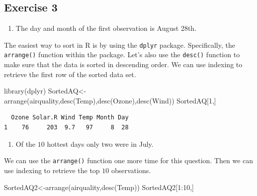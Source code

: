 \documentclass[
  letterpaper,
  DIV=11,
  numbers=noendperiod]{scrreprt}
\newenvironment{Shaded}{\begin{snugshade}}{\end{snugshade}}
\newcommand{\DecValTok}[1]{\textcolor[rgb]{0.68,0.00,0.00}{#1}}
\newcommand{\FunctionTok}[1]{\textcolor[rgb]{0.28,0.35,0.67}{#1}}
\newcommand{\NormalTok}[1]{\textcolor[rgb]{0.00,0.23,0.31}{#1}}
\newcommand{\OtherTok}[1]{\textcolor[rgb]{0.00,0.23,0.31}{#1}}
\newcommand{\SpecialCharTok}[1]{\textcolor[rgb]{0.37,0.37,0.37}{#1}}
\providecommand{\tightlist}{%
  \setlength{\itemsep}{0pt}\setlength{\parskip}{0pt}}\usepackage{longtable,booktabs,array}
\begin{document}
\hypertarget{exercise-3-1}{%
\subsection*{Exercise 3}\label{exercise-3-1}}

\begin{enumerate}
\def\labelenumi{\arabic{enumi}.}
\tightlist
\item
  The day and month of the first observation is August 28th.
\end{enumerate}

The easiest way to sort in R is by using the \texttt{dplyr} package.
Specifically, the \texttt{arrange()} function within the package. Let's
also use the \texttt{desc()} function to make sure that the data is
sorted in descending order. We can use indexing to retrieve the first
row of the sorted data set.

\begin{Shaded}
\begin{Highlighting}[numbers=left,,]
\FunctionTok{library}\NormalTok{(dplyr)}
\NormalTok{SortedAQ}\OtherTok{\textless{}{-}}\FunctionTok{arrange}\NormalTok{(airquality,}\FunctionTok{desc}\NormalTok{(Temp),}\FunctionTok{desc}\NormalTok{(Ozone),}\FunctionTok{desc}\NormalTok{(Wind))}
\NormalTok{SortedAQ[}\DecValTok{1}\NormalTok{,]}
\end{Highlighting}
\end{Shaded}

\begin{verbatim}
  Ozone Solar.R Wind Temp Month Day
1    76     203  9.7   97     8  28
\end{verbatim}

\begin{enumerate}
\def\labelenumi{\arabic{enumi}.}
\setcounter{enumi}{1}
\tightlist
\item
  Of the \(10\) hottest days only two were in July.
\end{enumerate}

We can use the \texttt{arrange()} function one more time for this
question. Then we can use indexing to retrieve the top \(10\)
observations.

\begin{Shaded}
\begin{Highlighting}[numbers=left,,]
\NormalTok{SortedAQ2}\OtherTok{\textless{}{-}}\FunctionTok{arrange}\NormalTok{(airquality,}\FunctionTok{desc}\NormalTok{(Temp))}
\NormalTok{SortedAQ2[}\DecValTok{1}\SpecialCharTok{:}\DecValTok{10}\NormalTok{,]}
\end{Highlighting}
\end{Shaded}
\end{document}
